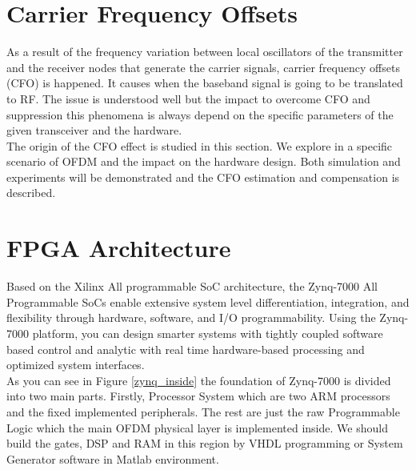 \section{Carrier Frequency Offsets}
\label{sec_simstruct}
As a result of the frequency variation between local oscillators of the transmitter and the receiver nodes that generate the carrier signals, carrier frequency offsets (CFO) is happened. It causes when the baseband signal is going to be translated to RF. The issue is understood well but the impact to overcome CFO and suppression this phenomena is always depend on the specific parameters of the given transceiver and the hardware.\\
The origin of the CFO effect is studied in this section. We explore in a specific scenario of OFDM and the impact on the hardware design. Both simulation and experiments will be demonstrated and the CFO estimation and compensation is described.\\

\section{FPGA Architecture}
\label{fpga_arch}
Based on the Xilinx All programmable SoC architecture, the Zynq-7000 All Programmable SoCs enable extensive system level differentiation, integration, and flexibility through hardware, software, and I/O programmability. Using the Zynq-7000 platform, you can design smarter systems with tightly coupled software based control and analytic with real time hardware-based processing and optimized system interfaces.\\
As you can see in Figure \ref{zynq_inside} the foundation of Zynq-7000 is divided into two main parts. Firstly, Processor System which are two ARM processors and the fixed implemented peripherals. The rest are just the raw Programmable Logic which the main OFDM physical layer is implemented inside. We should build the gates, DSP and RAM in this region by VHDL programming or System Generator software in Matlab environment.\\


